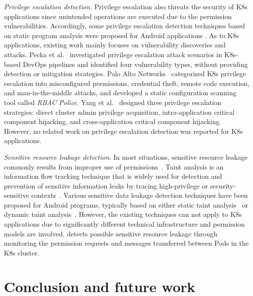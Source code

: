 \documentclass[conference]{IEEEtran}
\theoremstyle{definition}
\begin{document}
\textit{Privilege escalation detection.} Privilege escalation also threats the security of K8s applications since unintended operations are executed due to the permission vulnerabilities. Accordingly, some  privilege escalation detection techniques based on static program analysis were proposed for Android applications \cite{zhongyang2013droidalarm,arzt2014flowdroid,bagheri2015covert,li2015iccta}. As to K8s applications, existing work mainly focuses on vulnerability discoveries and attacks. Pecka et al.~\cite{pecka2022privilege} investigated privilege escalation attack scenarios in K8s-based DevOps pipelines and identified four vulnerability types, without providing detection or mitigation strategies. Palo Alto Networks~\cite{paloalto2024} categorized K8s privilege escalation into misconfigured permissions, credential theft, remote code execution, and man-in-the-middle attacks, and developed a static configuration scanning tool called \textit{RBAC Police}. Yang et al.~\cite{yang2023take} designed three privilege escalation strategies: direct cluster admin privilege acquisition, intra-application critical component hijacking, and cross-application critical component hijacking. However, no related work on privilege escalation detection was reported for K8s applications.

\textit{Sensitive resource leakage detection.} In most situations, sensitive resource leakage commonly results from improper use of permissions~\cite{papadimitriou2010data}. Taint analysis is an information flow tracking technique that is widely used for detection and prevention of sensitive information leaks by tracing high-privilege or security-sensitive contexts~\cite{tripp2009taj}. Various sensitive data leakage detection techniques have been proposed for Android programs, typically based on either static taint analysis~\cite{wei2018amandroid,zhang2019fastdroid} or dynamic taint analysis~\cite{enck2014taintdroid,you2017taintman}. However, the existing techniques can not apply to K8s applications due to significantly different technical infrastructure and permission models are involved. \kg detects possible sensitive resource leakage through monitoring the permission requests and messages transferred between Pods in the K8s cluster.


\section{Conclusion and future work} 
\label{sec:con}
\end{document}
